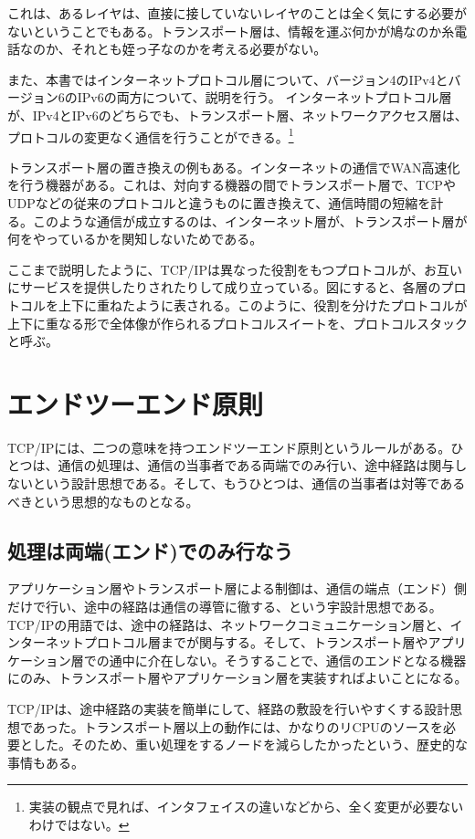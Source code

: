 これは、あるレイヤは、直接に接していないレイヤのことは全く気にする必要がないということでもある。トランスポート層は、情報を運ぶ何かが鳩なのか糸電話なのか、それとも姪っ子なのかを考える必要がない。

また、本書ではインターネットプロトコル層について、バージョン4のIPv4とバージョン6のIPv6の両方について、説明を行う。
インターネットプロトコル層が、IPv4とIPv6のどちらでも、トランスポート層、ネットワークアクセス層は、プロトコルの変更なく通信を行うことができる。\footnote{実装の観点で見れば、インタフェイスの違いなどから、全く変更が必要ないわけではない。}

トランスポート層の置き換えの例もある。インターネットの通信でWAN高速化を行う機器がある。これは、対向する機器の間でトランスポート層で、TCPやUDPなどの従来のプロトコルと違うものに置き換えて、通信時間の短縮を計る。このような通信が成立するのは、インターネット層が、トランスポート層が何をやっているかを関知しないためである。

ここまで説明したように、TCP/IPは異なった役割をもつプロトコルが、お互いにサービスを提供したりされたりして成り立っている。図にすると、各層のプロトコルを上下に重ねたように表される。このように、役割を分けたプロトコルが上下に重なる形で全体像が作られるプロトコルスイートを、プロトコルスタックと呼ぶ。


\section{エンドツーエンド原則}
TCP/IPには、二つの意味を持つエンドツーエンド原則というルールがある。ひとつは、通信の処理は、通信の当事者である両端でのみ行い、途中経路は関与しないという設計思想である。そして、もうひとつは、通信の当事者は対等であるべきという思想的なものとなる。

\subsection{処理は両端(エンド)でのみ行なう}

アプリケーション層やトランスポート層による制御は、通信の端点（エンド）側だけで行い、途中の経路は通信の導管に徹する、という宇設計思想である。
TCP/IPの用語では、途中の経路は、ネットワークコミュニケーション層と、インターネットプロトコル層までが関与する。そして、トランスポート層やアプリケーション層での通中に介在しない。そうすることで、通信のエンドとなる機器にのみ、トランスポート層やアプリケーション層を実装すればよいことになる。

TCP/IPは、途中経路の実装を簡単にして、経路の敷設を行いやすくする設計思想であった。トランスポート層以上の動作には、かなりのリCPUのソースを必要とした。そのため、重い処理をするノードを減らしたかったという、歴史的な事情もある。


